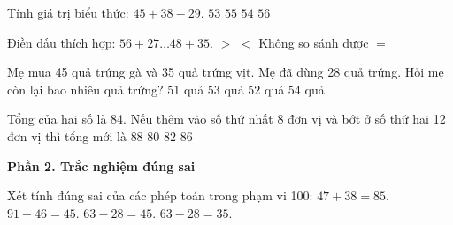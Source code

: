 \begin{ex} %
Tính giá trị biểu thức: $45 + 38 - 29$.
\choice
{$53$}
{$55$}
{\True $54$}
{$56$}
\end{ex}

\begin{ex} %
Điền dấu thích hợp: $56 + 27 \dots 48 + 35$.
\choice
{$>$}
{$<$}
{Không so sánh được}
{\True $=$}
\end{ex}

\begin{ex} %
Mẹ mua 45 quả trứng gà và 35 quả trứng vịt. Mẹ đã dùng 28 quả trứng. Hỏi mẹ còn lại bao nhiêu quả trứng?
\choice
{$51$ quả}
{$53$ quả}
{\True $52$ quả}
{$54$ quả}
\end{ex}

\begin{ex} %
Tổng của hai số là 84. Nếu thêm vào số thứ nhất 8 đơn vị và bớt ở số thứ hai 12 đơn vị thì tổng mới là
\choice
{$88$}
{\True $80$}
{$82$}
{$86$}
\end{ex}

\textbf{Phần 2. Trắc nghiệm đúng sai}

\begin{ex} %
Xét tính đúng sai của các phép toán trong phạm vi 100:
\choiceTF
{\True $47 + 38 = 85$.}
{\True $91 - 46 = 45$.}
{$63 - 28 = 45$.}
{\True $63 - 28 = 35$.}
\end{ex}

